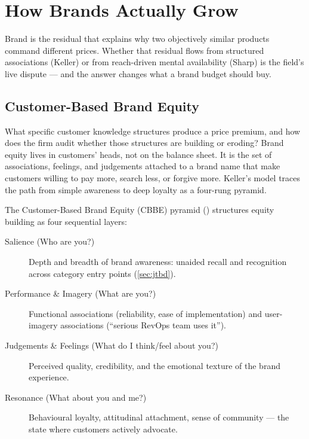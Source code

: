 \chapter{How Brands Actually Grow}\label{ch:brand-growth}


Brand is the residual that explains why two objectively similar products command different prices. Whether that residual flows from structured associations (Keller) or from reach-driven mental availability (Sharp) is the field's live dispute --- and the answer changes what a brand budget should buy.

\section{Customer-Based Brand Equity}\label{sec:cbbe}

What specific customer knowledge structures produce a price premium, and how does the firm audit whether those structures are building or eroding? Brand equity lives in customers' heads, not on the balance sheet. It is the set of associations, feelings, and judgements attached to a brand name that make customers willing to pay more, search less, or forgive more. Keller's model traces the path from simple awareness to deep loyalty as a four-rung pyramid.

The Customer-Based Brand Equity (CBBE) pyramid (\textcite{keller1993customer}) structures equity building as four sequential layers:

\begin{description}
  \item[Salience (Who are you?)] Depth and breadth of brand awareness: unaided recall and recognition across category entry points (\cref{sec:jtbd}).
  \item[Performance \& Imagery (What are you?)] Functional associations (reliability, ease of implementation) and user-imagery associations (``serious RevOps team uses it'').
  \item[Judgements \& Feelings (What do I think/feel about you?)] Perceived quality, credibility, and the emotional texture of the brand experience.
  \item[Resonance (What about you and me?)] Behavioural loyalty, attitudinal attachment, sense of community --- the state where customers actively advocate.
\end{description}

